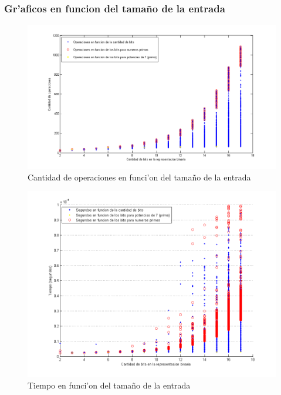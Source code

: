 \subsubsection{Gr'aficos en funcion del tama\~{n}o de la entrada}
\begin{figure}[H]
\centering
\includegraphics[scale=0.7]{../../codigo/ejercicio1/benchmark/graficos/tamanio_Entrada_T/operacionesEntrada.png}
\caption{Cantidad de operaciones en funci'on del tama\~{n}o de la entrada}
\label{Ej1fig5}
\end{figure}

\begin{figure}[H]
\centering
\includegraphics[scale=0.7]{../../codigo/ejercicio1/benchmark_de_tiempo/graficos/tamanio_Entrada_T/Tiempo_en_funcion_bits.png}
\caption{Tiempo en funci'on del tama\~{n}o de la entrada}
\label{Ej1fig6}
\end{figure}

